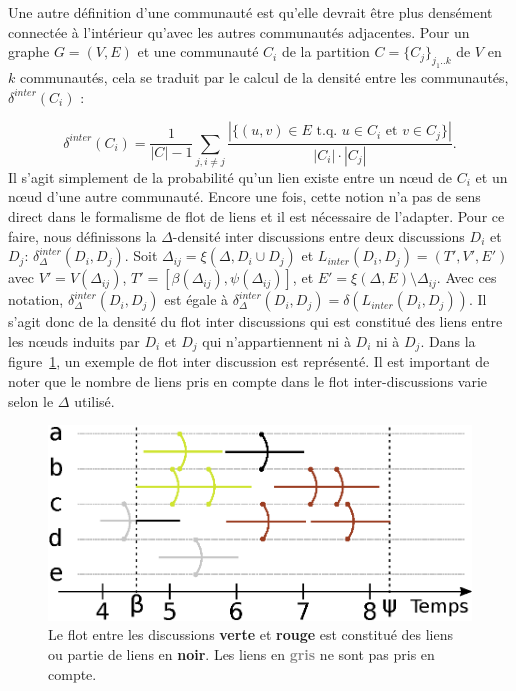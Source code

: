 Une autre définition d'une communauté est qu'elle devrait être plus densément connectée à l'intérieur qu'avec les autres communautés adjacentes.
Pour un graphe $G=(V,E)$ et une communauté $C_i$ de la partition $C = \{C_j\}_{j_1..k}$ de $V$ en $k$ communautés, cela se traduit par le calcul de la densité entre les communautés, $\delta^{inter}(C_i)$ :

\begin{equation}
	\delta^{inter}(C_i) = \frac{1}{|C|-1}\sum_{j, i\ne j}\frac{|\{(u,v)\in E\mbox{ t.q. }u\in C_i\mbox{ et }v\in C_j\}|}{|C_i|\cdot |C_j|}.
\end{equation}
Il s'agit simplement de la probabilité qu'un lien existe entre un n\oe ud de $C_i$ et un n\oe ud d'une autre communauté.
Encore une fois, cette notion n'a pas de sens direct dans le formalisme de flot de liens et il est nécessaire de l'adapter.
Pour ce faire, nous définissons la $\Delta$-densité inter discussions entre deux discussions $D_i$ et $D_j$: $\delta^{inter}_{\Delta}(D_i,D_j)$.
Soit $\Delta_{ij}=\xi(\Delta,D_i \cup D_j)$ et $L_{inter}(D_i, D_j) = (T',V',E')$ avec 
$V'= V(\Delta_{ij})$, $T'=[\beta(\Delta_{ij}), \psi(\Delta_{ij})]$, et $E' = \xi(\Delta,E) \setminus \Delta_{ij}$.
Avec ces notation, $\delta^{inter}_{\Delta}(D_i,D_j)$ est égale à $\delta^{inter}_{\Delta}(D_i,D_j) = \delta(L_{inter}(D_i, D_j))$.
Il s'agit donc de la densité du flot inter discussions qui est constitué des liens entre les n\oe uds induits par $D_i$ et $D_j$ qui n'appartiennent ni à $D_i$ ni à $D_j$.
Dans la figure~\ref{fig:inter_dens_discussion_ex}, un exemple de flot inter discussion est représenté.
Il est important de noter que le nombre de liens pris en compte dans le flot inter-discussions varie selon le $\Delta$ utilisé.

\begin{figure}
\centering
	\includegraphics[width=0.65\linewidth]{img/mailing/inter_flot.eps}
\caption{Le flot entre les discussions \textcolor{olivegreen}{\textbf{verte}} et  \textcolor{briquered}{\textbf{rouge}} est constitué des liens ou partie de liens en \textbf{noir}. Les liens en \textcolor{gray}{\textbf{gris}} ne sont pas pris en compte.}
\label{fig:inter_dens_discussion_ex}
\end{figure}



